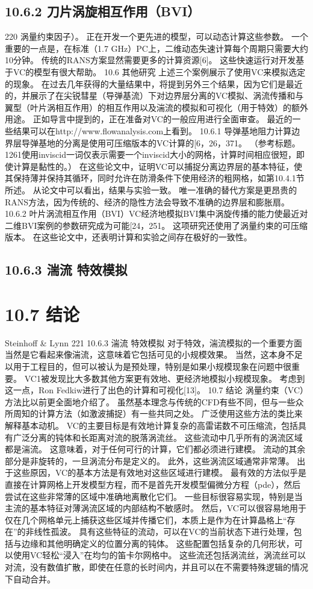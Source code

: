 \documentclass[UTF8,11pt,a4paper,openany,fontset=fandol]{ctexbook}
\begin{document}
\subsection{10.6.2 刀片涡旋相互作用（BVI）}
220 涡量约束因子）。 正在开发一个更先进的模型，可以动态计算这些参数。 一个重要的一点是，在标准（1.7 GHz）PC上，二维动态失速计算每个周期只需要大约10分钟。 传统的RANS方案显然需要更多的计算资源[6]。 这些快速运行对开发基于VC的模型有很大帮助。 10.6 其他研究 上述三个案例展示了使用VC来模拟选定的现象。 在过去几年获得的大量结果中，将提到另外三个结果，因为它们是最近的，并展示了在尖锐彗星（导弹基流）下对边界层分离的VC模拟、涡流传播和与翼型（叶片涡相互作用）的相互作用以及湍流的模拟和可视化（用于特效）的额外用途。 正如导言中提到的，正在准备对VC的一般应用进行全面审查。 最近的一些结果可以在http://www.flowanalysis.com上看到。 10.6.1 导弹基地阻力计算边界层导弹基地的分离是使用可压缩版本的VC计算的[6，26，371。 （参考标题。 1261使用inviscid一词仅表示需要一个inviscid大小的网格，计算时间相应很短，即使计算是黏性的。） 在这些论文中，证明VC可以捕捉分离边界层的基本特征，使其保持薄并保持其循环，同时允许在防滑条件下使用经济的粗网格，如第10.4.1节所述。 从论文中可以看出，结果与实验一致。 唯一准确的替代方案是更昂贵的RANS方法，因为传统的、经济的隐性方法会导致不准确的边界层和膨胀扇。 10.6.2 叶片涡流相互作用（BVI）VC经济地模拟BVI集中涡旋传播的能力使最近对二维BVI案例的参数研究成为可能[24，251。 这项研究还使用了涡量约束的可压缩版本。 在这些论文中，还表明计算和实验之间存在极好的一致性。

\subsection{10.6.3 湍流 特效模拟}
\section{10.7 结论}
Steinhoff \& Lynn 221 10.6.3 湍流 特效模拟 对于特效，湍流模拟的一个重要方面当然是它看起来像湍流，这意味着它包括可见的小规模效果。 当然，这本身不足以用于工程目的，但可以被认为是预处理，特别是如果小规模现象在问题中很重要。 VC1被发现比大多数其他方案更有效地、更经济地模拟小规模现象。 考虑到这一点，Ron Fedkiw进行了出色的计算和可视化[13]。 10.7 结论 涡量约束（VC）方法比以前更全面地介绍了。 虽然基本理念与传统的CFD有些不同，但与一些众所周知的计算方法（如激波捕捉）有一些共同之处。 广泛使用这些方法的类比来解释基本动机。 VC的主要目标是有效地计算复杂的高雷诺数不可压缩流，包括具有广泛分离的钝体和长距离对流的脱落涡流丝。 这些流动中几乎所有的涡流区域都是湍流。 这意味着，对于任何可行的计算，它们都必须进行建模。 流动的其余部分是非旋转的，一旦涡流分布是定义的。 此外，这些涡流区域通常非常薄。 出于这些原因，VC的基本方法是有效地对这些区域进行建模。 最有效的方法似乎是直接在计算网格上开发模型方程，而不是首先开发模型偏微分方程（pde），然后尝试在这些非常薄的区域中准确地离散化它们。 一些目标很容易实现，特别是当主流的基本特征对薄涡流区域的内部结构不敏感时。 然后，VC可以很容易地用于仅在几个网格单元上捕获这些区域并传播它们，本质上是作为在计算晶格上“存在”的非线性孤波。 具有这些特征的流动，可以在VC的当前状态下进行处理，包括与边缘和其他明确定义的位置分离的钝体。 这些配置包括复杂的几何形状，可以使用VC轻松“浸入”在均匀的笛卡尔网格中。 这些流还包括涡流丝，涡流丝可以对流，没有数值扩散，即使在任意的长时间内，并且可以在不需要特殊逻辑的情况下自动合并。
\end{document}
